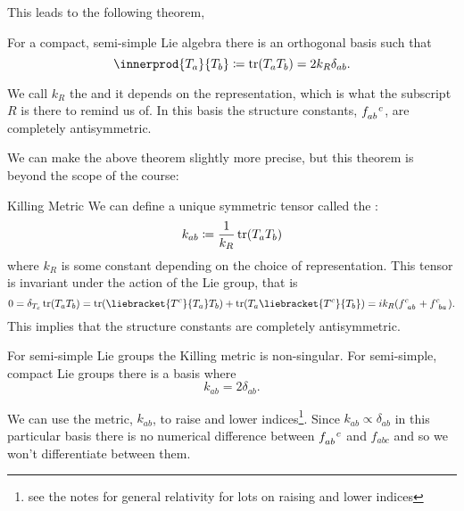 This leads to the following theorem,
\begin{thm}{}{}
    For a compact, semi-simple Lie algebra there is an orthogonal basis such that
    \begin{equation}
        \innerprod{T_a}{T_b} \coloneqq \tr(T_aT_b) = 2k_{R}\delta_{ab}.
    \end{equation}
\end{thm}
We call \(k_R\) the  and it depends on the representation, which is what the subscript \(R\) is there to remind us of.
In this basis the structure constants, \(\tensor{f}{_{ab}^c}\), are completely antisymmetric.

We can make the above theorem slightly more precise, but this theorem is beyond the scope of the course:
\begin{thm}{Killing Metric}{}
    We can define a unique symmetric tensor called the :
    \begin{equation}
        k_{ab} \coloneqq \frac{1}{k_R} \operatorname{tr}(T_aT_b)
    \end{equation}
    where \(k_R\) is some constant depending on the choice of representation.
    This tensor is invariant under the action of the Lie group, that is
    \begin{equation}
        0 = \delta_{T_c} \tr(T_aT_b) = \tr(\liebracket{T^c}{T_a}T_b) + \tr(T_a\liebracket{T^c}{T_b}) = ik_R(\tensor{f}{^c_{ab}} + \tensor{f}{^c_{ba}}).
    \end{equation}
    This implies that the structure constants are completely antisymmetric.
    
    For semi-simple Lie groups the Killing metric is non-singular.
    For semi-simple, compact Lie groups there is a basis where
    \begin{equation}
        k_{ab} = 2\delta_{ab}.
    \end{equation}
\end{thm}

We can use the metric, \(k_{ab}\), to raise and lower indices\footnote{see the notes for general relativity for lots on raising and lower indices}.
Since \(k_{ab} \propto \delta_{ab}\) in this particular basis there is no numerical difference between \(\tensor{f}{_{ab}^c}\) and \(f_{abc}\) and so we won't differentiate between them.


